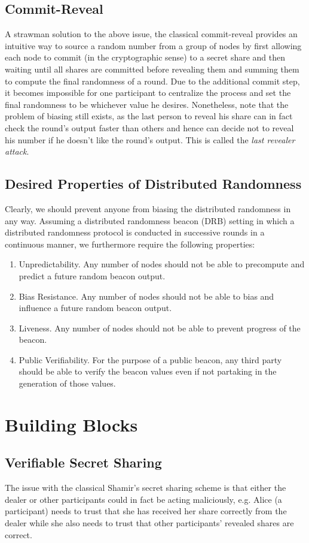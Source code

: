 \documentclass[11pt]{article}
\theoremstyle{definition}
\theoremstyle{remark}
\begin{document}
\subsection{Commit-Reveal}
A strawman solution to the above issue, the classical commit-reveal provides an intuitive way to source a random number from a group of nodes by first allowing each node to commit (in the cryptographic sense) to a secret share and then waiting until all shares are committed before revealing them and summing them to compute the final randomness of a round. Due to the additional commit step, it becomes impossible for one participant to centralize the process and set the final randomness to be whichever value he desires. Nonetheless, note that the problem of biasing still exists, as the last person to reveal his share can in fact check the round's output faster than others and hence can decide not to reveal his number if he doesn't like the round's output. This is called the \textit{last revealer attack}.

\subsection{Desired Properties of Distributed Randomness}
Clearly, we should prevent anyone from biasing the distributed randomness in any way. Assuming a distributed randomness beacon (DRB) setting in which a distributed randomness protocol is conducted in successive rounds in a continuous manner, we furthermore require the following properties:
\begin{enumerate}
\item Unpredictability. Any number of nodes should not be able to precompute and predict a future random beacon output.
\item Bias Resistance. Any number of nodes should not be able to bias and influence a future random beacon output.
\item Liveness. Any number of nodes should not be able to prevent progress of the beacon.
\item Public Verifiability. For the purpose of a public beacon, any third party should be able to verify the beacon values even if not partaking in the generation of those values.
\end{enumerate}

\section{Building Blocks}
\subsection{Verifiable Secret Sharing}
The issue with the classical Shamir's secret sharing scheme is that either the dealer or other participants could in fact be acting maliciously, e.g. Alice (a participant) needs to trust that she has received her share correctly from the dealer while she also needs to trust that other participants' revealed shares are correct.
\end{document}
